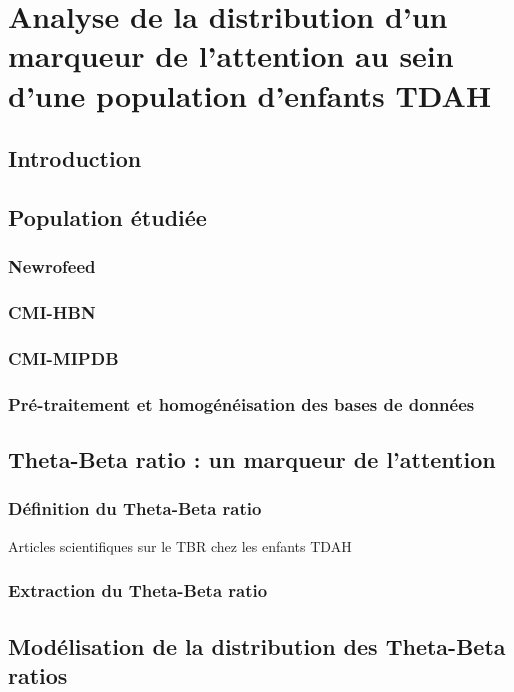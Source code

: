 \chapter{Analyse de la distribution d'un marqueur de l'attention au sein d'une population d'enfants TDAH}

\section*{Introduction}

\section{Population étudiée}

\subsection{Newrofeed}

\subsection{CMI-HBN}

\subsection{CMI-MIPDB}

\subsection{Pré-traitement et homogénéisation des bases de données}

\section{Theta-Beta ratio : un marqueur de l'attention}

\subsection{Définition du Theta-Beta ratio}
Articles scientifiques sur le TBR chez les enfants TDAH

\subsection{Extraction du Theta-Beta ratio}

\section{Modélisation de la distribution des Theta-Beta ratios}

